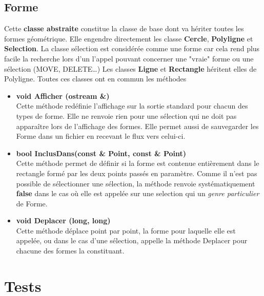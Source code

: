 \documentclass[12pt]{article}
\begin{document}
\subsection{Forme}
Cette \textbf{classe abstraite} constitue la classe de base dont va hériter toutes les formes géométrique. Elle engendre directement les classe \textbf{Cercle}, \textbf{Polyligne} et \textbf{Selection}. La classe sélection est considérée comme une forme car cela rend plus facile la recherche lors d'un l'appel pouvant concerner une "vraie" forme ou une sélection (MOVE, DELETE\ldots)  Les classes \textbf{Ligne} et \textbf{Rectangle} héritent elles de Polyligne. Toutes ces classes ont en commun les méthodes
\begin{itemize}
\item\textbf{void Afficher (ostream \&)}\\
Cette méthode redéfinie l'affichage sur la sortie standard pour chacun des types de forme. Elle ne renvoie rien pour une sélection qui ne doit pas apparaître lors de l'affichage des formes. Elle permet aussi de sauvegarder les Forme dans un fichier en recevant le flux vers celui-ci.
\item \textbf{bool InclusDans(const \& Point, const \& Point)}\\
 Cette méthode permet de définir si la forme est contenue entièrement dans le rectangle formé par les deux points passés en paramètre. Comme il n'est pas possible de sélectionner une sélection, la méthode renvoie systématiquement \textbf{false} dans le cas où elle est appelée sur une selection qui un \textit{genre particulier} de Forme.
\item\textbf{void Deplacer (long, long)}\\
Cette méthode déplace point par point, la forme pour laquelle elle est appelée, ou dans le cas d'une sélection, appelle la méthode Deplacer pour chacune des formes la constituant.
\end{itemize}

\section{Tests}
\end{document}
